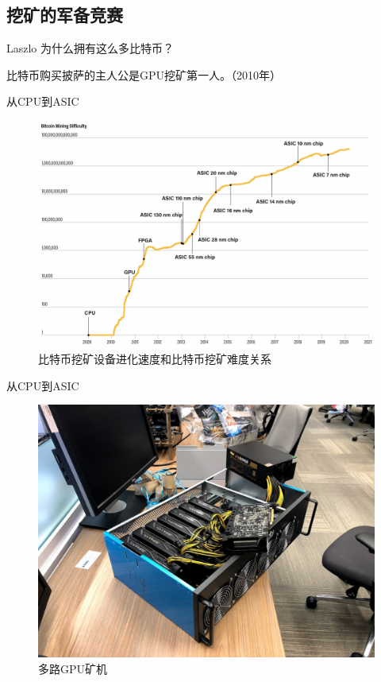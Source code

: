 \documentclass[11pt]{beamer}
\begin{document}
\subsection{挖矿的军备竞赛}
\begin{frame}
	Laszlo 为什么拥有这么多比特币？
	
	比特币购买披萨的主人公是GPU挖矿第一人。（2010年）
\end{frame}

\begin{frame}{从CPU到ASIC}
\begin{figure}
	\centering
	\includegraphics[width=0.8\linewidth]{figures/deviceRevolutionWithPrice}
	\caption{比特币挖矿设备进化速度和比特币挖矿难度关系}
	\label{fig:devicerevolutionwithprice}
\end{figure}
\end{frame}

\begin{frame}{从CPU到ASIC}
	\begin{figure}
		\centering
		\includegraphics[width=0.7\linewidth]{figures/GPUMining}
		\caption{多路GPU矿机}
	\end{figure}
\end{frame}
\end{document}
